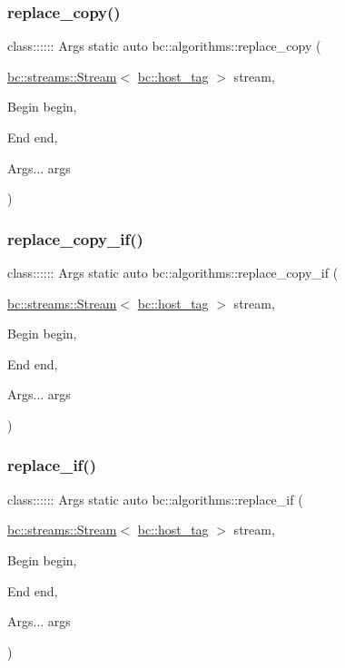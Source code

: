 \subsubsection{\texorpdfstring{replace\+\_\+copy()}{replace\_copy()}}
{\footnotesize\ttfamily class\+:::::: Args static auto bc\+::algorithms\+::replace\+\_\+copy (\begin{DoxyParamCaption}\item[{\hyperlink{classbc_1_1streams_1_1Stream}{bc\+::streams\+::\+Stream}$<$ \hyperlink{structbc_1_1host__tag}{bc\+::host\+\_\+tag} $>$}]{stream,  }\item[{Begin}]{begin,  }\item[{End}]{end,  }\item[{Args...}]{args }\end{DoxyParamCaption})}

\mbox{\label{namespacebc_1_1algorithms_aeff94887b8b785a757aa0c183a686d58}} 
\subsubsection{\texorpdfstring{replace\+\_\+copy\+\_\+if()}{replace\_copy\_if()}}
{\footnotesize\ttfamily class\+:::::: Args static auto bc\+::algorithms\+::replace\+\_\+copy\+\_\+if (\begin{DoxyParamCaption}\item[{\hyperlink{classbc_1_1streams_1_1Stream}{bc\+::streams\+::\+Stream}$<$ \hyperlink{structbc_1_1host__tag}{bc\+::host\+\_\+tag} $>$}]{stream,  }\item[{Begin}]{begin,  }\item[{End}]{end,  }\item[{Args...}]{args }\end{DoxyParamCaption})}

\mbox{\label{namespacebc_1_1algorithms_a82d4bf30ced3ed3664e9415fa28e7198}} 
\subsubsection{\texorpdfstring{replace\+\_\+if()}{replace\_if()}}
{\footnotesize\ttfamily class\+:::::: Args static auto bc\+::algorithms\+::replace\+\_\+if (\begin{DoxyParamCaption}\item[{\hyperlink{classbc_1_1streams_1_1Stream}{bc\+::streams\+::\+Stream}$<$ \hyperlink{structbc_1_1host__tag}{bc\+::host\+\_\+tag} $>$}]{stream,  }\item[{Begin}]{begin,  }\item[{End}]{end,  }\item[{Args...}]{args }\end{DoxyParamCaption})}

